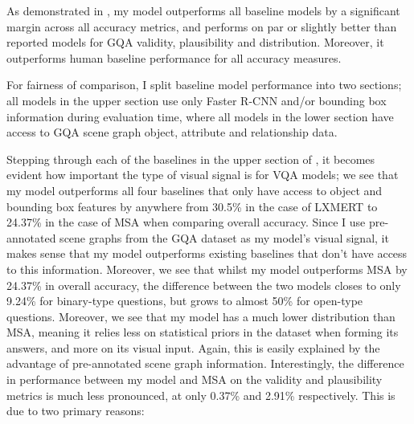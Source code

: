 As demonstrated in \tableautorefname{ \ref{table:performance_comparison}}, my model outperforms all baseline models by a significant margin across all accuracy metrics, and performs on par or slightly better than reported models for GQA validity, plausibility and distribution. Moreover, it outperforms human baseline performance for all accuracy measures.

For fairness of comparison, I split baseline model performance into two sections; all models in the upper section use only Faster R-CNN and/or bounding box information during evaluation time, where all models in the lower section have access to GQA scene graph object, attribute and relationship data.

Stepping through each of the baselines in the upper section of \tableautorefname{ \ref{table:performance_comparison}}, it becomes evident how important the type of visual signal is for VQA models; we see that my model outperforms all four baselines that only have access to object and bounding box features by anywhere from 30.5\% in the case of LXMERT \cite{tang2019learning} to 24.37\% in the case of MSA \cite{farazi2020attention} when comparing overall accuracy. Since I use pre-annotated scene graphs from the GQA dataset as my model's visual signal, it makes sense that my model outperforms existing baselines that don't have access to this information. Moreover, we see that whilst my model outperforms MSA by 24.37\% in overall accuracy, the difference between the two models closes to only 9.24\% for binary-type questions, but grows to almost 50\% for open-type questions. Moreover, we see that my model has a much lower distribution than MSA, meaning it relies less on statistical priors in the dataset when forming its answers, and more on its visual input. Again, this is easily explained by the advantage of pre-annotated scene graph information. Interestingly, the difference in performance between my model and MSA on the validity and plausibility metrics is much less pronounced, at only 0.37\% and 2.91\% respectively. This is due to two primary reasons:

